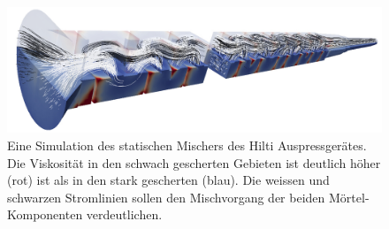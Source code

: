 %
\begin{figure}[htb]
    \centering
    \includegraphics[width=\textwidth]{figures/MischerSimResult.png}
    \caption{Eine Simulation des statischen Mischers des Hilti Auspressgerätes. Die Viskosität in den schwach gescherten Gebieten ist deutlich höher (rot) ist als in den stark gescherten (blau). Die weissen und schwarzen Stromlinien sollen den Mischvorgang der beiden Mörtel-Komponenten verdeutlichen.}
    \label{fig:mischerSimResult}
\end{figure}
%

